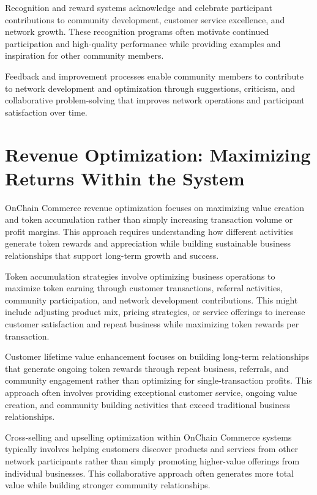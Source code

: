 \documentclass[
  Letterpaper,
]{scrbook}
\begin{document}
Recognition and reward systems acknowledge and celebrate participant
contributions to community development, customer service excellence, and
network growth. These recognition programs often motivate continued
participation and high-quality performance while providing examples and
inspiration for other community members.

Feedback and improvement processes enable community members to
contribute to network development and optimization through suggestions,
criticism, and collaborative problem-solving that improves network
operations and participant satisfaction over time.

\section{Revenue Optimization: Maximizing Returns Within the
System}\label{revenue-optimization-maximizing-returns-within-the-system}

OnChain Commerce revenue optimization focuses on maximizing value
creation and token accumulation rather than simply increasing
transaction volume or profit margins. This approach requires
understanding how different activities generate token rewards and
appreciation while building sustainable business relationships that
support long-term growth and success.

Token accumulation strategies involve optimizing business operations to
maximize token earning through customer transactions, referral
activities, community participation, and network development
contributions. This might include adjusting product mix, pricing
strategies, or service offerings to increase customer satisfaction and
repeat business while maximizing token rewards per transaction.

Customer lifetime value enhancement focuses on building long-term
relationships that generate ongoing token rewards through repeat
business, referrals, and community engagement rather than optimizing for
single-transaction profits. This approach often involves providing
exceptional customer service, ongoing value creation, and community
building activities that exceed traditional business relationships.

Cross-selling and upselling optimization within OnChain Commerce systems
typically involves helping customers discover products and services from
other network participants rather than simply promoting higher-value
offerings from individual businesses. This collaborative approach often
generates more total value while building stronger community
relationships.
\end{document}
